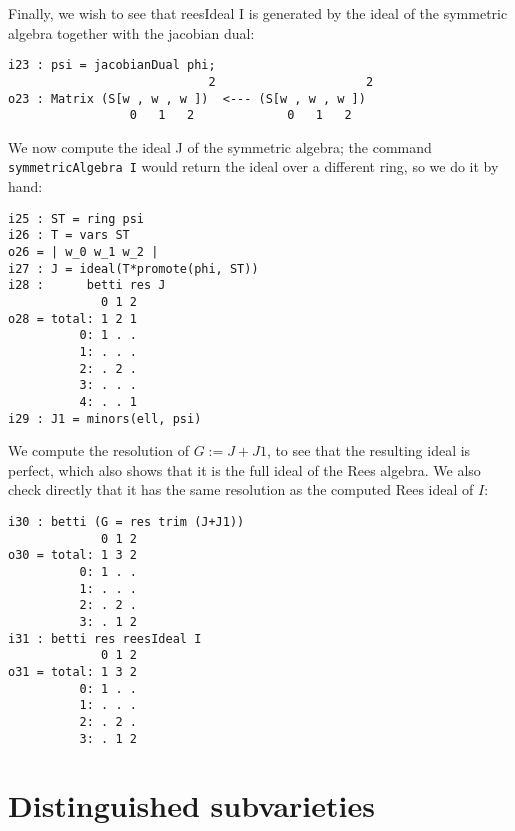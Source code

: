 \documentclass[twoside,12pt, leqno]{amsart}
\begin{document}
Finally, we wish to see that reesIdeal I is generated by the ideal 
           of the symmetric algebra together with the jacobian dual:
\begin{footnotesize}
 \begin{verbatim}
i23 : psi = jacobianDual phi;
                            2                     2
o23 : Matrix (S[w , w , w ])  <--- (S[w , w , w ])
                 0   1   2             0   1   2
\end{verbatim}
\end{footnotesize}
We now compute the ideal J of the symmetric algebra; the command \\ {\tt symmetricAlgebra I}
           would return the ideal over a different ring, so we do it by hand:
\begin{footnotesize}
 \begin{verbatim}
i25 : ST = ring psi
i26 : T = vars ST
o26 = | w_0 w_1 w_2 |
i27 : J = ideal(T*promote(phi, ST))
i28 :      betti res J
             0 1 2
o28 = total: 1 2 1
          0: 1 . .
          1: . . .
          2: . 2 .
          3: . . .
          4: . . 1
i29 : J1 = minors(ell, psi)
  \end{verbatim}
  \end{footnotesize}
We compute the resolution of $G := J+J1$, to see that the resulting ideal is perfect, which also shows that
it is the full ideal of the Rees algebra. We also check directly that it has the same resolution as the computed
Rees ideal of $I$:
\begin{footnotesize}
 \begin{verbatim}
i30 : betti (G = res trim (J+J1))
             0 1 2
o30 = total: 1 3 2
          0: 1 . .
          1: . . .
          2: . 2 .
          3: . 1 2
i31 : betti res reesIdeal I
             0 1 2
o31 = total: 1 3 2
          0: 1 . .
          1: . . .
          2: . 2 .
          3: . 1 2
  \end{verbatim}
  \end{footnotesize}

     

\section{Distinguished subvarieties}%
\end{document}
